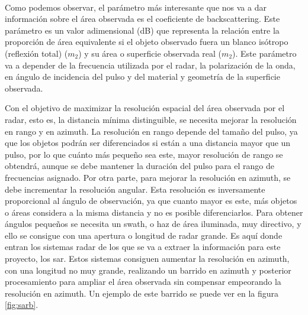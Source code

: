 \\
\par Como podemos observar, el parámetro más interesante que nos va a dar información sobre el área observada es el coeficiente de backscattering. Este parámetro es un valor adimensional (dB) que representa la relación entre la proporción de área equivalente si el objeto observado fuera un blanco isótropo (reflexión total) ($m_{2}$) y su área o superficie observada real ($m_{2}$). Este parámetro va a depender de la frecuencia utilizada por el radar, la polarización de la onda, en ángulo de incidencia del pulso y del material y geometría de la superficie observada.
\\
\par Con el objetivo de maximizar la resolución espacial del área observada por el radar, esto es, la distancia mínima distinguible, se necesita mejorar la resolución en rango y en azimuth. La resolución en rango depende del tamaño del pulso, ya que los objetos podrán ser diferenciados si están a una distancia mayor que un pulso, por lo que cuánto más pequeño sea este, mayor resolución de rango se obtendrá, aunque se debe mantener la duración del pulso para el rango de frecuencias asignado. Por otra parte, para mejorar la resolución en azimuth, se debe incrementar la resolución angular. Esta resolución es inversamente proporcional al ángulo de observación, ya que cuanto mayor es este, más objetos o áreas considera a la misma distancia y no es posible diferenciarlos. Para obtener ángulos pequeños se necesita un swath, o haz de área iluminada, muy directivo, y ello se consigue con una apertura o longitud de radar grande. Es aquí donde entran los sistemas radar de los que se va a extraer la información para este proyecto, los \gls{sar}. Estos sistemas consiguen aumentar la resolución en azimuth, con una longitud no muy grande, realizando un barrido en azimuth y posterior procesamiento para ampliar el área observada sin compensar empeorando la resolución en azimuth. Un ejemplo de este barrido se puede ver en la figura \ref{fig:sarb}.
